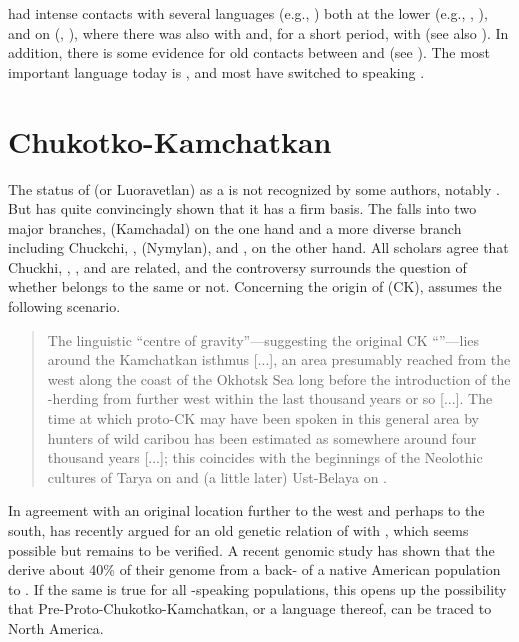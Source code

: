  had intense contacts with several  languages (e.g., \citealt{Gusev2015b}) both at the lower  (e.g., , ), and on  (,  ), where there was also  with  and, for a short period, with  (see also \citealt{Yamada2010}). In addition, there is some evidence for old contacts between  and  (see \citealt{Vovin2016}). The most important  language today is , and most  have switched to speaking .

\section{Chukotko-Kamchatkan}\label{sec:2.3}
\largerpage
The status of  (or Luoravetlan) as a  is not recognized by some authors, notably \citet{GeorgVolodin1999}. But \citet{Fortescue2003,Fortescue2005,Fortescue2011} has quite convincingly shown that it has a firm basis. The  falls into two major branches,  (Kamchadal) on the one hand and a more diverse branch including Chuckchi, ,  (Nymylan), and , on the other hand. All scholars agree that Chuckhi, , , and  are related, and the controversy surrounds the question of whether  belongs to the same  or not. Concerning the origin of  (CK), \citet[3]{Fortescue2005} assumes the following scenario.

\begin{quote}
The linguistic “centre of gravity”---suggesting the original CK “”---lies around the Kamchatkan isthmus [...], an area presumably reached from the west along the coast of the Okhotsk Sea long before the introduction of the -herding from further west within the last thousand years or so [...]. The time at which proto-CK may have been spoken in this general area by hunters of wild caribou has been estimated as somewhere around four thousand years [...]; this coincides with the beginnings of the Neolothic cultures of Tarya on  and (a little later) Ust-Belaya on .
\end{quote}

In agreement with an original location further to the west and perhaps to the south, \citet{Fortescue2011} has recently argued for an old genetic relation of  with , which seems possible but remains to be verified. A recent genomic study has shown that the  derive about 40\% of their genome from a back- of a native American population to  \citep[184]{Reich2018}. If the same is true for all -speaking populations, this opens up the possibility that Pre-Proto-Chukot\-ko-Kamchatkan, or a  language thereof, can be traced to North America.

